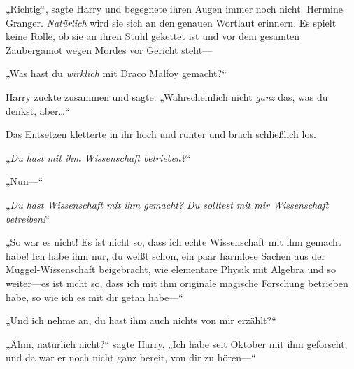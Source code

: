 „Richtig“, sagte Harry und begegnete ihren Augen immer noch nicht.
Hermine Granger. \emph{Natürlich} wird sie sich an den genauen Wortlaut erinnern. Es spielt keine Rolle, ob sie an ihren Stuhl gekettet ist und vor dem gesamten Zaubergamot wegen Mordes vor Gericht steht—

„Was hast du \emph{wirklich} mit Draco Malfoy gemacht?“

Harry zuckte zusammen und sagte: „Wahrscheinlich nicht \emph{ganz} das, was du denkst, aber…“

Das Entsetzen kletterte in ihr hoch und runter und brach schließlich los.

„\emph{Du hast mit ihm \emph{Wissenschaft} betrieben?}“

„Nun—“

„\emph{Du hast \emph{Wissenschaft} mit ihm gemacht? Du solltest mit \emph{mir} Wissenschaft betreiben!}“

„So war es nicht! Es ist nicht so, dass ich echte Wissenschaft mit ihm gemacht habe! Ich habe ihm nur, du weißt schon, ein paar harmlose Sachen aus der Muggel-Wissenschaft beigebracht, wie elementare Physik mit Algebra und so weiter—es ist nicht so, dass ich mit ihm originale magische Forschung betrieben habe, so wie ich es mit dir getan habe—“

„Und ich nehme an, du hast ihm auch nichts von mir erzählt?“

„Ähm, natürlich nicht?“ sagte Harry. „Ich habe seit Oktober mit ihm geforscht, und da war er noch nicht ganz bereit, von dir zu hören—“

